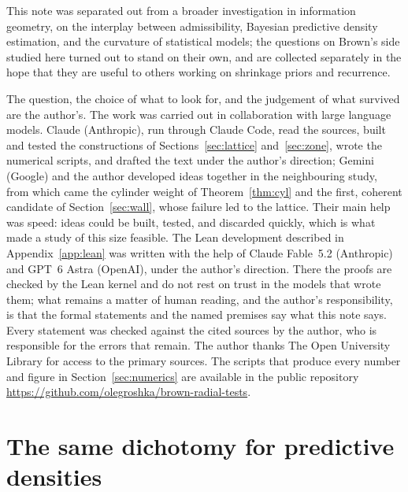 \documentclass[11pt]{amsart}
\theoremstyle{plain}
\theoremstyle{definition}
\theoremstyle{remark}
\begin{document}
This note was separated out from a broader investigation in information geometry,
on the interplay between admissibility, Bayesian predictive density estimation,
and the curvature of statistical models; the questions on Brown's side studied
here turned out to stand on their own, and are collected separately in the hope
that they are useful to others working on shrinkage priors and recurrence.

The question, the choice of what to look for, and the judgement of what survived
are the author's. The work was carried out in collaboration with large language
models. Claude (Anthropic), run through Claude Code, read the sources, built and
tested the constructions of Sections~\ref{sec:lattice} and~\ref{sec:zone}, wrote
the numerical scripts, and drafted the text under the author's direction; Gemini
(Google) and the author developed ideas together in the neighbouring study, from
which came the cylinder weight of Theorem~\ref{thm:cyl} and the first, coherent
candidate of Section~\ref{sec:wall}, whose failure led to the lattice. Their
main help was speed: ideas could be built, tested, and discarded quickly, which
is what made a study of this size feasible. The Lean development described in
Appendix~\ref{app:lean} was written with the help of Claude Fable~5.2
(Anthropic) and GPT~6 Astra (OpenAI), under the author's direction. There the
proofs are checked by the Lean kernel and do not rest on trust in the models
that wrote them; what remains a matter of human reading, and the author's
responsibility, is that the formal statements and the named premises say what
this note says. Every statement was checked against
the cited sources by the author, who is responsible for the errors that remain.
The author thanks The Open University Library for access to the primary sources.
The scripts that produce every number and figure in Section~\ref{sec:numerics}
are available in the public repository
\url{https://github.com/olegroshka/brown-radial-tests}.

\appendix

\section{The same dichotomy for predictive densities}\label{app:komaki}
\end{document}
